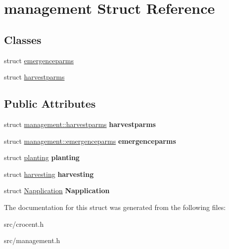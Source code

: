 \hypertarget{structmanagement}{\section{management Struct Reference}
\label{structmanagement}
}
\subsection*{Classes}
\begin{DoxyCompactItemize}
\item 
struct \hyperlink{structmanagement_1_1emergenceparms}{emergenceparms}
\item 
struct \hyperlink{structmanagement_1_1harvestparms}{harvestparms}
\end{DoxyCompactItemize}
\subsection*{Public Attributes}
\begin{DoxyCompactItemize}
\item 
\hypertarget{structmanagement_a1c116264bf2f0a6e806d7afecd6b9ae6}{struct \hyperlink{structmanagement_1_1harvestparms}{management\-::harvestparms} {\bfseries harvestparms}}\label{structmanagement_a1c116264bf2f0a6e806d7afecd6b9ae6}

\item 
\hypertarget{structmanagement_ae2fbc2fb090ed90835c0e919de8e8d89}{struct \hyperlink{structmanagement_1_1emergenceparms}{management\-::emergenceparms} {\bfseries emergenceparms}}\label{structmanagement_ae2fbc2fb090ed90835c0e919de8e8d89}

\item 
\hypertarget{structmanagement_a3876737464f84bce918ffa786d482d4a}{struct \hyperlink{structplanting}{planting} {\bfseries planting}}\label{structmanagement_a3876737464f84bce918ffa786d482d4a}

\item 
\hypertarget{structmanagement_a6ccc766c42162fec716337857f71da9f}{struct \hyperlink{structharvesting}{harvesting} {\bfseries harvesting}}\label{structmanagement_a6ccc766c42162fec716337857f71da9f}

\item 
\hypertarget{structmanagement_a261b2b48ed9e822565306252f017c818}{struct \hyperlink{struct_napplication}{Napplication} {\bfseries Napplication}}\label{structmanagement_a261b2b48ed9e822565306252f017c818}

\end{DoxyCompactItemize}


The documentation for this struct was generated from the following files\-:\begin{DoxyCompactItemize}
\item 
src/crocent.\-h\item 
src/management.\-h\end{DoxyCompactItemize}
